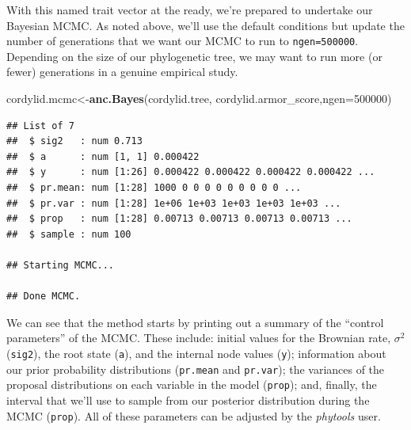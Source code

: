 \documentclass[fleqn,10pt,lineno]{wlpeerj} %
\newenvironment{Shaded}{\begin{snugshade}}{\end{snugshade}}
\newcommand{\AttributeTok}[1]{\textcolor[rgb]{0.13,0.29,0.53}{#1}}
\newcommand{\DecValTok}[1]{\textcolor[rgb]{0.00,0.00,0.81}{#1}}
\newcommand{\FunctionTok}[1]{\textcolor[rgb]{0.13,0.29,0.53}{\textbf{#1}}}
\newcommand{\NormalTok}[1]{#1}
\newcommand{\OtherTok}[1]{\textcolor[rgb]{0.56,0.35,0.01}{#1}}
\newcommand{\SpecialCharTok}[1]{\textcolor[rgb]{0.81,0.36,0.00}{\textbf{#1}}}
\begin{document}
\begin{Shaded}
\end{Shaded}

With this named trait vector at the ready, we're prepared to undertake our Bayesian MCMC. As noted above, we'll use the default conditions but update the number of generations that we want our MCMC to run to \texttt{ngen=500000}. Depending on the size of our phylogenetic tree, we may want to run more (or fewer) generations in a genuine empirical study.

\begin{Shaded}
\begin{Highlighting}[]
\NormalTok{cordylid.mcmc}\OtherTok{\textless{}{-}}\FunctionTok{anc.Bayes}\NormalTok{(cordylid.tree,}
\NormalTok{  cordylid.armor\_score,}\AttributeTok{ngen=}\DecValTok{500000}\NormalTok{)}
\end{Highlighting}
\end{Shaded}

\begin{verbatim}
## List of 7
##  $ sig2   : num 0.713
##  $ a      : num [1, 1] 0.000422
##  $ y      : num [1:26] 0.000422 0.000422 0.000422 0.000422 ...
##  $ pr.mean: num [1:28] 1000 0 0 0 0 0 0 0 0 0 ...
##  $ pr.var : num [1:28] 1e+06 1e+03 1e+03 1e+03 1e+03 ...
##  $ prop   : num [1:28] 0.00713 0.00713 0.00713 0.00713 ...
##  $ sample : num 100

## Starting MCMC...

## Done MCMC.
\end{verbatim}

We can see that the method starts by printing out a summary of the ``control parameters'' of the MCMC. These include: initial values for the Brownian rate, \(\sigma^{2}\) (\texttt{sig2}), the root state (\texttt{a}), and the internal node values (\texttt{y}); information about our prior probability distributions (\texttt{pr.mean} and \texttt{pr.var}); the variances of the proposal distributions on each variable in the model (\texttt{prop}); and, finally, the interval that we'll use to sample from our posterior distribution during the MCMC (\texttt{prop}). All of these parameters can be adjusted by the \emph{phytools} user.
\end{document}
